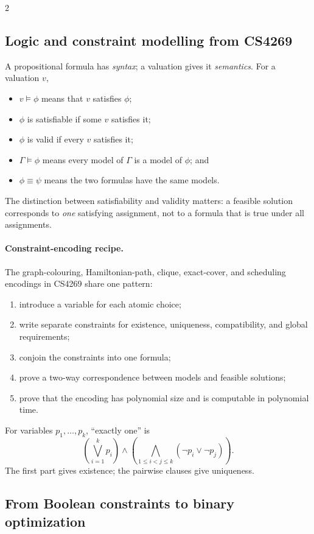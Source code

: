 \documentclass[10pt]{article}
\theoremstyle{definition}
\begin{document}
\begin{multicols*}{2}
\subsection{Logic and constraint modelling from CS4269}

A propositional formula has \emph{syntax}; a valuation gives it
\emph{semantics}.  For a valuation $v$,
\begin{itemize}
  \item $v\models\phi$ means that $v$ satisfies $\phi$;
  \item $\phi$ is satisfiable if some $v$ satisfies it;
  \item $\phi$ is valid if every $v$ satisfies it;
  \item $\Gamma\models\phi$ means every model of $\Gamma$ is a model of
        $\phi$; and
  \item $\phi\equiv\psi$ means the two formulas have the same models.
\end{itemize}
The distinction between satisfiability and validity matters: a feasible
solution corresponds to \emph{one} satisfying assignment, not to a formula
that is true under all assignments.

\paragraph{Constraint-encoding recipe.}
The graph-colouring, Hamiltonian-path, clique, exact-cover, and scheduling
encodings in CS4269 share one pattern:
\begin{enumerate}
  \item introduce a variable for each atomic choice;
  \item write separate constraints for existence, uniqueness, compatibility,
        and global requirements;
  \item conjoin the constraints into one formula;
  \item prove a two-way correspondence between models and feasible solutions;
  \item prove that the encoding has polynomial size and is computable in
        polynomial time.
\end{enumerate}
For variables $p_1,\ldots,p_k$, ``exactly one'' is
\[
  \left(\bigvee_{i=1}^k p_i\right)
  \land
  \left(\bigwedge_{1\le i<j\le k}(\neg p_i\lor\neg p_j)\right).
\]
The first part gives existence; the pairwise clauses give uniqueness.

\subsection{From Boolean constraints to binary optimization}


\end{multicols*}
\end{document}
